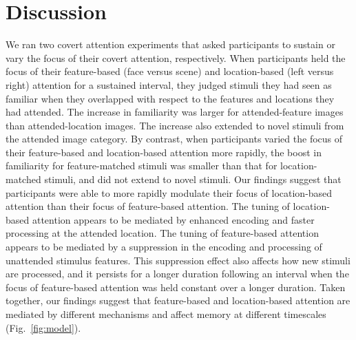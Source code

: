 \documentclass[english]{article}
\begin{document}
\section*{Discussion}

We ran two covert attention experiments that asked participants to sustain or
vary the focus of their covert attention, respectively. When participants held
the focus of their feature-based (face versus scene) and location-based (left
versus right) attention for a sustained interval, they judged stimuli they had
seen as familiar when they overlapped with respect to the features and
locations they had attended. The increase in familiarity was larger for
attended-feature images than attended-location images. The increase also
extended to novel stimuli from the attended image category. By contrast, when
participants varied the focus of their feature-based and location-based
attention more rapidly, the boost in familiarity for feature-matched stimuli
was smaller than that for location-matched stimuli, and did not extend to novel
stimuli. Our findings suggest that participants were able to more rapidly
modulate their focus of location-based attention than their focus of
feature-based attention. The tuning of location-based attention appears to be
mediated by enhanced encoding and faster processing at the attended location.
The tuning of feature-based attention appears to be mediated by a suppression
in the encoding and processing of unattended stimulus features. This
suppression effect also affects how new stimuli are processed, and it persists
for a longer duration following an interval when the focus of feature-based
attention was held constant over a longer duration. Taken together, our
findings suggest that feature-based and location-based attention are mediated
by different mechanisms and affect memory at different timescales
(Fig.~\ref{fig:model}).


\end{document}
